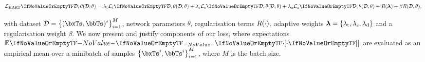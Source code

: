    	\begin{equation}
   		\loss[\mathrm{HART}]{\data, \theta} = \lambda_{\mathrm{t}} \loss[\mathrm{t}]{\data, \theta} + \lambda_{\mathrm{s}} \loss[\mathrm{s}]{\data, \theta} + \lambda_{\mathrm{a}} \loss[\mathrm{a}]{\data, \theta}  + \reg{ \B{\lambda} } + \beta \reg{ \data, \theta },
   	\end{equation}
   
   with dataset $\data = \set{\fences{\bxTs, \bbTs}^i}_{i=1}^{M}$, network parameters $\theta$, regularisation terms $R (\cdot)$, adaptive weights $\B{\lambda} = \{ \lambda_{\mathrm{t}}, \lambda_{\mathrm{s}} , \lambda_{\mathrm{d}} \}$ and a regularisation weight $\beta$. We now present and justify components of our loss, where expectations $\expc{\cdot}$ are evaluated as an empirical mean over a minibatch of samples $\set{\bxTs^i , \bbTs^i}_{i=1}^M$, where $M$ is the batch size.
   
